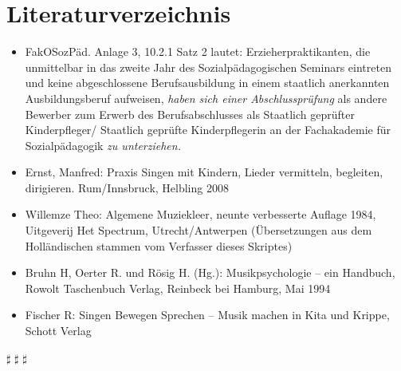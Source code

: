 \documentclass[10pt,a4paper,twoside]{report}
\begin{document}
\chapter*{Literaturverzeichnis}
\begin{itemize}
\item FakOSozPäd. Anlage 3, 10.2.1 Satz 2 lautet:
\glqq Erzieherpraktikanten, die unmittelbar in das zweite Jahr des Sozialpädagogischen Seminars eintreten und keine abgeschlossene Berufsausbildung in einem staatlich anerkannten Ausbildungsberuf aufweisen, \emph{haben sich einer Ab\-schluss\-prüfung} als andere Bewerber zum Erwerb des Berufsabschlusses als Staatlich ge\-prüf\-ter Kinderpfleger/ Staatlich geprüfte Kinderpflegerin an der Fach\-aka\-demie für Sozialpädagogik \emph{zu unter\-zie\-hen.\grqq}

\item Ernst, Manfred: Praxis Singen mit Kindern, Lieder vermitteln, begleiten, dirigieren. Rum/Innsbruck, Helbling 2008

\item Willemze Theo: Algemene Muziekleer, neunte verbesserte Auflage 1984, Uitgeverij Het Spectrum, Utrecht/Antwerpen (Übersetzungen aus dem Holländischen stammen vom Verfasser dieses Skriptes)

\item Bruhn H, Oerter R. und Rösig H. (Hg.): Musikpsychologie -- ein Handbuch, Rowolt Taschenbuch 
Verlag, Reinbeck bei Hamburg, Mai 1994

\item Fischer R: Singen Bewegen Sprechen -- Musik machen in Kita und Krippe, Schott Verlag
\end{itemize}
\newpage
$\sharp$
\newpage
$\sharp$
\newpage
$\sharp$
\end{document}
